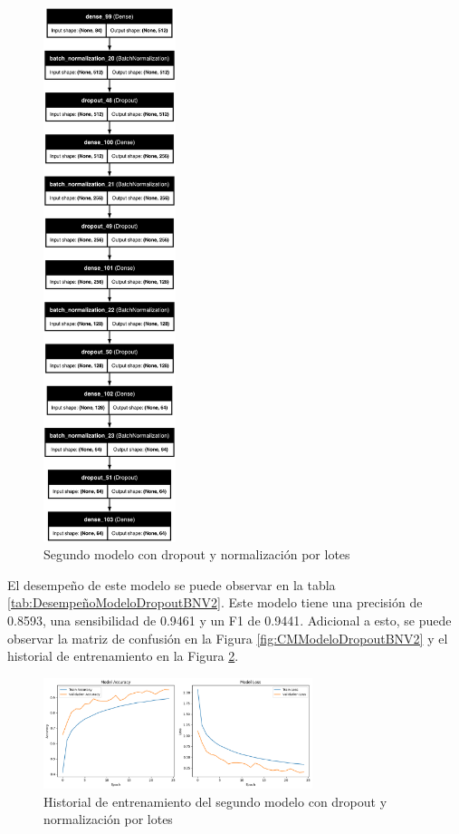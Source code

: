 \begin{figure}[H]
    \centering
    \includegraphics[width=0.345\textwidth]{figuras/modelDropoutBNV2.png}
    \caption{Segundo modelo con dropout y normalización por lotes}
    \label{fig:ModeloDropoutBNV2}
\end{figure}

El desempeño de este modelo se puede observar en la tabla \ref{tab:DesempeñoModeloDropoutBNV2}.
Este modelo tiene una precisión de 0.8593, una sensibilidad de 0.9461 y un F1 de 0.9441.
Adicional a esto, se puede observar la matriz de confusión en la Figura \ref{fig:CMModeloDropoutBNV2} y el historial de entrenamiento en la Figura \ref{fig:HistoryModeloDropoutBNV2}.

\begin{figure}[H]
    \centering
    \includegraphics[width=0.7\textwidth]{figuras/modelDropoutBNV2History.png}
    \caption{Historial de entrenamiento del segundo modelo con dropout y normalización por lotes}
    \label{fig:HistoryModeloDropoutBNV2}
\end{figure}

